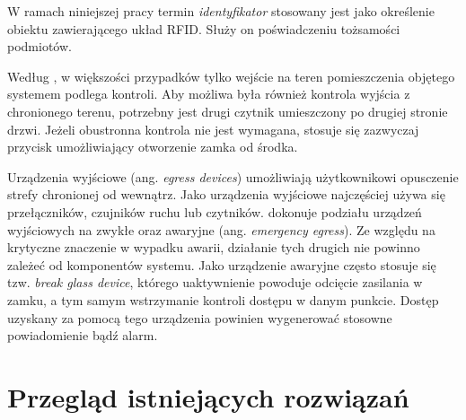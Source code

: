 		W ramach niniejszej pracy termin \textit{identyfikator} stosowany jest jako określenie obiektu zawierającego układ RFID. Służy on poświadczeniu tożsamości podmiotów.

		Według \cite{bsia2016}, w większości przypadków tylko wejście na teren pomieszczenia objętego systemem podlega kontroli. Aby możliwa była również kontrola wyjścia z chronionego terenu, potrzebny jest drugi czytnik umieszczony po drugiej stronie drzwi. Jeżeli obustronna kontrola nie jest wymagana, stosuje się zazwyczaj przycisk umożliwiający otworzenie zamka od środka.

		Urządzenia wyjściowe (ang. \textit{egress devices}) umożliwiają użytkownikowi opusczenie strefy chronionej od wewnątrz. Jako urządzenia wyjściowe najczęściej używa się przełączników, czujników ruchu lub czytników. \cite{bsia2016} dokonuje podziału urządzeń wyjściowych na zwykłe oraz awaryjne (ang. \textit{emergency egress}). Ze względu na krytyczne znaczenie w wypadku awarii, działanie tych drugich nie powinno zależeć od komponentów systemu. Jako urządzenie awaryjne często stosuje się tzw. \textit{break glass device}, którego uaktywnienie powoduje odcięcie zasilania w zamku, a tym samym wstrzymanie kontroli dostępu w danym punkcie. Dostęp uzyskany za pomocą tego urządzenia powinien wygenerować stosowne powiadomienie bądź alarm.

	\section{Przegląd istniejących rozwiązań}

